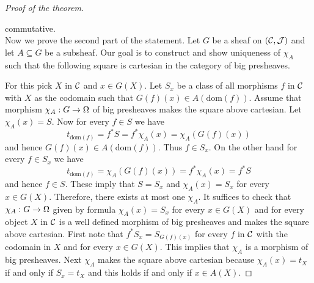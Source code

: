 \begin{proof}[Proof of the theorem]
\begin{center}
\end{center}
commutative.\\
Now we prove the second part of the statement. Let $G$ be a sheaf on $({\mathcal C},{\mathcal J})$ and let $A\subseteq G$ be a subsheaf. Our goal is to construct and show uniqueness of $\chi_A$ such that the following square is cartesian in the category of big presheaves.
\begin{center}
\end{center}
For this pick $X$ in ${\mathcal C}$ and $x\in G(X)$. Let $S_x$ be a class of all morphisms $f$ in ${\mathcal C}$ with $X$ as the codomain such that $G(f)(x)\in A(\mathrm{dom}(f))$. Assume that morphism $\chi_A:G\rightarrow \Omega$ of big presheaves makes the square above cartesian. Let $\chi_A(x) = S$. Now for every $f\in S$ we have
$$t_{\mathrm{dom}(f)} = f^*S = f^*\chi_A(x) = \chi_A\left(G(f)(x)\right)$$
and hence $G(f)(x) \in A(\mathrm{dom}(f))$. Thus $f\in S_x$. On the other hand for every $f\in S_x$ we have
$$t_{\mathrm{dom}(f)} = \chi_A\left(G(f)(x)\right) = f^*\chi_A(x) =  f^*S$$
and hence $f\in S$. These imply that $S = S_x$ and $\chi_A(x) = S_x$ for every $x\in G(X)$. Therefore, there exists at most one $\chi_A$. It suffices to check that $\chi_A:G\rightarrow \Omega$ given by formula $\chi_A(x) = S_x$ for every $x\in G(X)$ and for every object $X$ in ${\mathcal C}$ is a well defined morphism of big presheaves and makes the square above cartesian. First note that $f^*S_x =S_{G(f)(x)}$ for every $f$ in ${\mathcal C}$ with the codomain in $X$ and for every $x\in G(X)$. This implies that $\chi_A$ is a morphism of big presheaves. Next $\chi_A$ makes the square above cartesian because $\chi_A(x) = t_X$ if and only if $S_x = t_X$ and this holds  if and only if $x\in A(X)$.
\end{proof}

